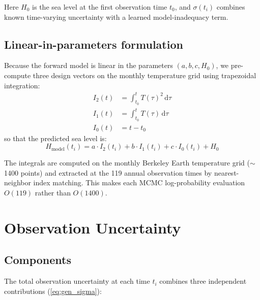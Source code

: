 \documentclass[11pt]{article}
\begin{document}
Here $H_0$ is the sea level at the first observation time $t_0$, and $\sigma(t_i)$ combines known time-varying uncertainty with a learned model-inadequacy term.

\subsection{Linear-in-parameters formulation}

Because the forward model is linear in the parameters $(a, b, c, H_0)$, we pre-compute three design vectors on the monthly temperature grid using trapezoidal integration:
\begin{align}
  I_2(t) &= \int_{t_0}^{t} T(\tau)^2\,\mathrm{d}\tau \\
  I_1(t) &= \int_{t_0}^{t} T(\tau)\,\mathrm{d}\tau \\
  I_0(t) &= t - t_0
\end{align}
so that the predicted sea level is:
\begin{equation}
  H_{\text{model}}(t_i) = a \cdot I_2(t_i) + b \cdot I_1(t_i) + c \cdot I_0(t_i) + H_0
  \label{eq:linear}
\end{equation}

The integrals are computed on the monthly Berkeley Earth temperature grid ($\sim$1400 points) and extracted at the 119 annual observation times by nearest-neighbor index matching.  This makes each MCMC log-probability evaluation $O(119)$ rather than $O(1400)$.


\section{Observation Uncertainty}

\subsection{Components}

The total observation uncertainty at each time $t_i$ combines three independent contributions (\cref{eq:gen_sigma}):
\end{document}
